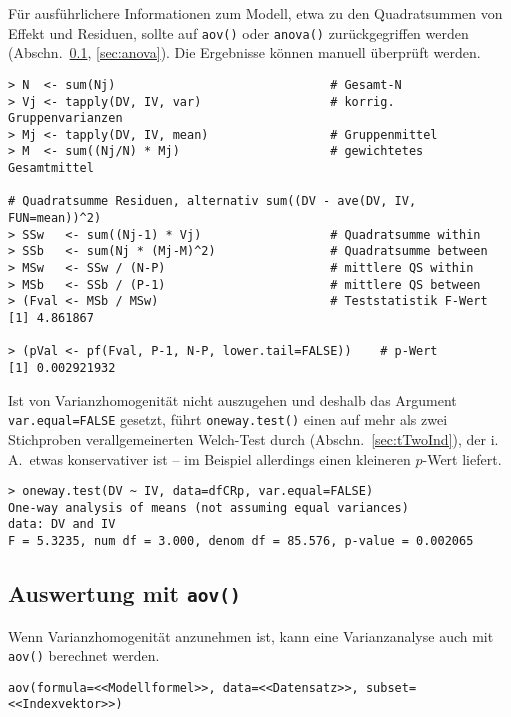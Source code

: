 Für ausführlichere Informationen zum Modell, etwa zu den Quadratsummen von Effekt und Residuen, sollte auf \lstinline!aov()! oder \lstinline!anova()! zurückgegriffen werden (Abschn.\ \ref{sec:aov}, \ref{sec:anova}). Die Ergebnisse können manuell überprüft werden.
\begin{lstlisting}
> N  <- sum(Nj)                              # Gesamt-N
> Vj <- tapply(DV, IV, var)                  # korrig. Gruppenvarianzen
> Mj <- tapply(DV, IV, mean)                 # Gruppenmittel
> M  <- sum((Nj/N) * Mj)                     # gewichtetes Gesamtmittel

# Quadratsumme Residuen, alternativ sum((DV - ave(DV, IV, FUN=mean))^2)
> SSw   <- sum((Nj-1) * Vj)                  # Quadratsumme within
> SSb   <- sum(Nj * (Mj-M)^2)                # Quadratsumme between
> MSw   <- SSw / (N-P)                       # mittlere QS within
> MSb   <- SSb / (P-1)                       # mittlere QS between
> (Fval <- MSb / MSw)                        # Teststatistik F-Wert
[1] 4.861867

> (pVal <- pf(Fval, P-1, N-P, lower.tail=FALSE))    # p-Wert
[1] 0.002921932
\end{lstlisting}

Ist von Varianzhomogenität nicht auszugehen und deshalb das Argument \lstinline!var.equal=FALSE! gesetzt, führt \lstinline!oneway.test()! einen auf mehr als zwei Stichproben verallgemeinerten Welch-Test durch (Abschn.\ \ref{sec:tTwoInd}), der i.\,A.\ etwas konservativer ist -- im Beispiel allerdings einen kleineren $p$-Wert liefert.
\begin{lstlisting}
> oneway.test(DV ~ IV, data=dfCRp, var.equal=FALSE)
One-way analysis of means (not assuming equal variances)
data: DV and IV
F = 5.3235, num df = 3.000, denom df = 85.576, p-value = 0.002065
\end{lstlisting}

\subsection{Auswertung mit \texttt{aov()}}
\label{sec:aov}

Wenn Varianzhomogenität anzunehmen ist, kann eine Varianzanalyse auch mit \lstinline!aov()! berechnet werden.
\begin{lstlisting}
aov(formula=<<Modellformel>>, data=<<Datensatz>>, subset=<<Indexvektor>>)
\end{lstlisting}

